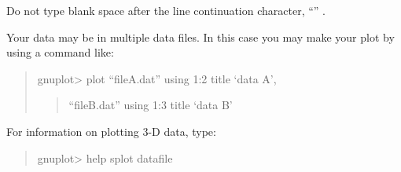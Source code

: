 \documentclass[letterpaper,10pt,english]{sphinxmanual}
\begin{document}
Do not type blank space after the line continuation character, ``'' .

Your data may be in multiple data files. In this case you may make your plot by using a command like:
\begin{quote}

gnuplot\textgreater{}  plot  ``fileA.dat'' using 1:2 title `data A', 
\begin{quote}

``fileB.dat'' using 1:3 title `data B'
\end{quote}
\end{quote}

For information on plotting 3-D data, type:
\begin{quote}

gnuplot\textgreater{}  help splot datafile
\end{quote}



\renewcommand{\indexname}{Index}
\printindex
\end{document}
